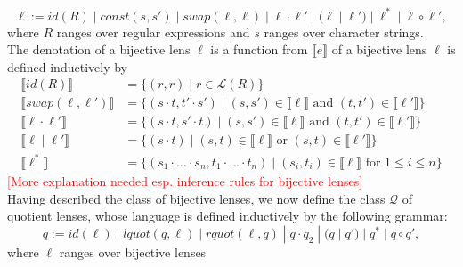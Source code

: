 \documentclass{svproc}
\begin{document}
$$\ell := id(R) \; | \; const(s, s') \; | \;  swap(\ell,
\ell) \; | \; \ell \cdot \ell' \; |  \; (\ell \; | \; \ell') \; | \; \ell^* \;
| \; \ell \circ \ell',$$ where $R$ ranges over regular expressions and $s$
ranges over character strings.\\
The denotation of a bijective lens $\ell$ is a function from 
$\llbracket e \rrbracket$ of a bijective lens $\ell$ is defined
inductively by
\begin{align*}
\llbracket id(R) \rrbracket &= \{(r, r) \; | \; r \in \mathcal{L}(R)\}\\
\llbracket swap(\ell, \ell') \rrbracket &= \{(s \cdot t, t' \cdot s') \; | \;
(s, s') \in \llbracket \ell \rrbracket \text{ and } (t, t') \in \llbracket
\ell' \rrbracket\}\\
\llbracket \ell \cdot \ell' \rrbracket &= \{(s \cdot t, s' \cdot t) \; | \;
(s, s') \in \llbracket \ell \rrbracket \text{ and } (t, t') \in \llbracket
\ell' \rrbracket\}\\
\llbracket \ell \; | \; \ell' \rrbracket &= \{(s \cdot t) \; | \;
(s, t) \in \llbracket \ell \rrbracket \text{ or } (s, t) \in \llbracket
\ell' \rrbracket\}\\
\llbracket \ell^* \rrbracket &= \{(s_1 \cdot \ldots \cdot s_n, t_1 \cdot \ldots
\cdot t_n) \; | \; (s_i, t_i) \in \llbracket \ell \rrbracket \text{ for } 1
\leq i \leq n\}
\end{align*}
\textcolor{red}{[More explanation needed esp. inference rules for bijective
lenses]}\\
Having described the class of bijective lenses, we now define the class
$\mathcal{Q}$ of quotient lenses, whose language is defined inductively by the
following grammar:
$$ q := id(\ell) \; | \; lquot(q, \ell) \; | \; rquot(\ell, q) \; | \; q
\cdot q_2 \; | \; (q \; | \; q') \; | \; q^* \; | \; q \circ q',$$
where $\ell$ ranges over bijective lenses 
\end{document}
